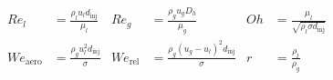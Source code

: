 

\begin{equation}
\label{eq:dimensionless_numbers_jicf}
\begin{aligned}
Re_l &= \frac{\rho_l u_l d_\mathrm{inj}}{\mu_l}          &  Re_g &= \frac{\rho_g u_g D_h}{\mu_g}              &  Oh &=  \frac{\mu_l}{\sqrt{\rho_l \sigma d_\mathrm{inj}}}\\
We_\mathrm{aero} &= \frac{\rho_g u_l^2 d_\mathrm{inj}}{\sigma}    &  We_\mathrm{rel} &= \frac{\rho_g \left( u_g - u_l \right)^2 d_\mathrm{inj}}{\sigma}          & r &= \frac{\rho_l}{\rho_g} 
\end{aligned}
\end{equation}

